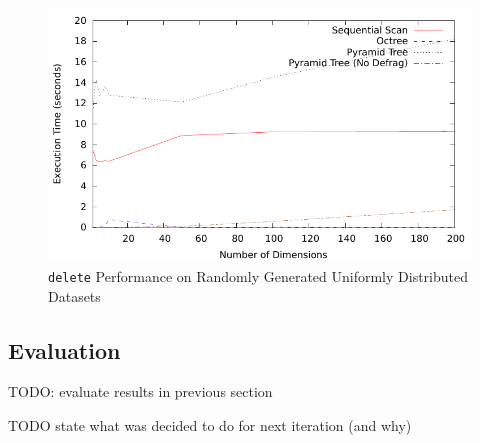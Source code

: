 \begin{figure}
	\centering
	\includegraphics[scale=0.8]{../results/end_of_iteration1/all_delete_randuniform.pdf}
	\caption{\texttt{delete} Performance on Randomly Generated Uniformly Distributed Datasets}
	\label{fig:perf-1-alldelete}
\end{figure}

\subsection{Evaluation}

TODO: evaluate results in previous section

TODO state what was decided to do for next iteration (and why)

